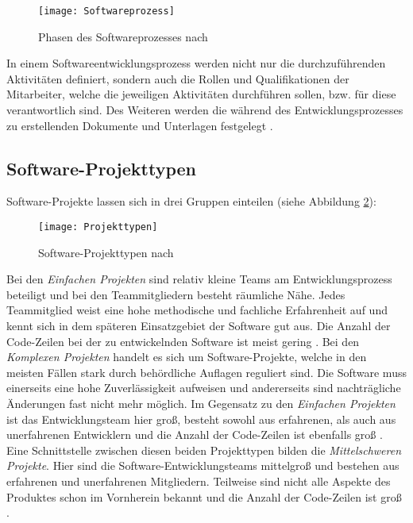 \begin{figure}[H]
\begin{center} 
  \texttt{[image: Softwareprozess]} %
  \caption{Phasen des Softwareprozesses nach \cite{Hanser2010}}
  \label{fig:SEProzess}
\end{center}
\end{figure}

In einem Softwareentwicklungsprozess werden nicht nur die durchzuführenden Aktivitäten definiert, sondern auch die Rollen und Qualifikationen der Mitarbeiter, welche die jeweiligen Aktivitäten durchführen sollen, bzw. für diese verantwortlich sind. Des Weiteren werden die während des Entwicklungsprozesses zu erstellenden Dokumente und Unterlagen festgelegt \cite{Hanser2010}.

\subsection{Software-Projekttypen}

Software-Projekte lassen sich in drei Gruppen einteilen (siehe Abbildung \ref{fig:Projektty}):
\begin{figure}[htp]
\begin{center}
  \texttt{[image: Projekttypen]} %
  \caption{Software-Projekttypen nach \cite{Boehm81}}
  \label{fig:Projektty}
\end{center}
\end{figure}
Bei den \textit{Einfachen Projekten} sind relativ kleine Teams am Entwicklungsprozess beteiligt und bei den Teammitgliedern besteht räumliche Nähe. Jedes Teammitglied weist eine hohe methodische und fachliche Erfahrenheit auf und kennt sich in dem späteren Einsatzgebiet der Software gut aus. Die Anzahl der Code-Zeilen bei der zu entwickelnden Software ist meist gering \cite{Boehm81, Hanser2010}. \newline
Bei den \textit{Komplexen Projekten} handelt es sich um Software-Projekte, welche in den meisten Fällen stark durch behördliche Auflagen reguliert sind. Die Software muss einerseits eine hohe Zuverlässigkeit aufweisen und andererseits sind nachträgliche Änderungen fast nicht mehr möglich. Im Gegensatz zu den \textit{Einfachen Projekten} ist das Entwicklungsteam hier groß, besteht sowohl aus erfahrenen, als auch aus unerfahrenen Entwicklern und die Anzahl der Code-Zeilen ist ebenfalls groß \cite{Boehm81, Hanser2010}. \newline
Eine Schnittstelle zwischen diesen beiden Projekttypen bilden die \textit{Mittelschweren Projekte}. Hier sind die Software-Entwicklungsteams mittelgroß und bestehen aus erfahrenen und unerfahrenen Mitgliedern. Teilweise sind nicht alle Aspekte des Produktes schon im Vornherein bekannt und die Anzahl der Code-Zeilen ist groß \cite{Boehm81, Hanser2010}.

